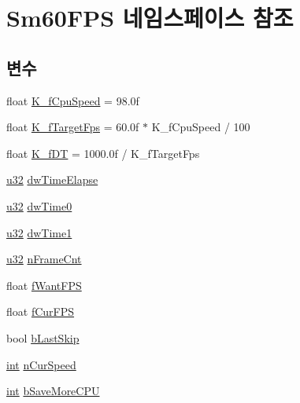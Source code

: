 \hypertarget{namespace_sm60_f_p_s}{}\section{Sm60\+F\+PS 네임스페이스 참조}
\label{namespace_sm60_f_p_s}
\subsection*{변수}
\begin{DoxyCompactItemize}
\item 
float \mbox{\hyperlink{namespace_sm60_f_p_s_ae07dfcd12e7bffdd83bdeb522dcee371}{K\+\_\+f\+Cpu\+Speed}} = 98.\+0f
\item 
float \mbox{\hyperlink{namespace_sm60_f_p_s_aa558076e1e1de8036533a25ff4244778}{K\+\_\+f\+Target\+Fps}} = 60.\+0f $\ast$ K\+\_\+f\+Cpu\+Speed / 100
\item 
float \mbox{\hyperlink{namespace_sm60_f_p_s_ab3e0a346fa132eb958ae5622c813cb99}{K\+\_\+f\+DT}} = 1000.\+0f / K\+\_\+f\+Target\+Fps
\item 
\mbox{\hyperlink{_system_8h_a10e94b422ef0c20dcdec20d31a1f5049}{u32}} \mbox{\hyperlink{namespace_sm60_f_p_s_a8456d33b653d1463e8dff058f592d96a}{dw\+Time\+Elapse}}
\item 
\mbox{\hyperlink{_system_8h_a10e94b422ef0c20dcdec20d31a1f5049}{u32}} \mbox{\hyperlink{namespace_sm60_f_p_s_a13cb7b4b6ffee739d08614c86e2c632c}{dw\+Time0}}
\item 
\mbox{\hyperlink{_system_8h_a10e94b422ef0c20dcdec20d31a1f5049}{u32}} \mbox{\hyperlink{namespace_sm60_f_p_s_ab4c0541dfc24ac03a8eea11a8e9b862a}{dw\+Time1}}
\item 
\mbox{\hyperlink{_system_8h_a10e94b422ef0c20dcdec20d31a1f5049}{u32}} \mbox{\hyperlink{namespace_sm60_f_p_s_af16a9bcb3b2eba01862bc42cd189c524}{n\+Frame\+Cnt}}
\item 
float \mbox{\hyperlink{namespace_sm60_f_p_s_add2b9096a788d1dc088810430f7d30bf}{f\+Want\+F\+PS}}
\item 
float \mbox{\hyperlink{namespace_sm60_f_p_s_aee0246375d7c962cc9bca89f54df61a5}{f\+Cur\+F\+PS}}
\item 
bool \mbox{\hyperlink{namespace_sm60_f_p_s_a6399e3de21aba714f8c9df222d4cba31}{b\+Last\+Skip}}
\item 
\mbox{\hyperlink{_util_8cpp_a0ef32aa8672df19503a49fab2d0c8071}{int}} \mbox{\hyperlink{namespace_sm60_f_p_s_ae76f2581ada4617c563e8297832c86a2}{n\+Cur\+Speed}}
\item 
\mbox{\hyperlink{_util_8cpp_a0ef32aa8672df19503a49fab2d0c8071}{int}} \mbox{\hyperlink{namespace_sm60_f_p_s_a89c7f4412351b871a7e4fd3e8921d634}{b\+Save\+More\+C\+PU}}
\end{DoxyCompactItemize}


